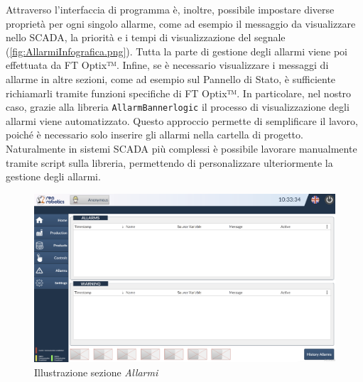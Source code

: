 Attraverso l'interfaccia di programma è, inoltre, possibile impostare diverse proprietà per ogni singolo allarme, come ad esempio il messaggio da visualizzare nello SCADA, la priorità e i tempi di visualizzazione del segnale (\ref{fig:AllarmiInfografica.png}). Tutta la parte di gestione degli allarmi viene poi effettuata da FT Optix™. Infine, se è necessario visualizzare i messaggi di allarme in altre sezioni, come ad esempio sul Pannello di Stato, è sufficiente richiamarli tramite funzioni specifiche di FT Optix™. In particolare, nel nostro caso, grazie alla libreria \verb|AllarmBannerlogic| il processo di visualizzazione degli allarmi viene automatizzato. Questo approccio permette di semplificare il lavoro, poiché è necessario solo inserire gli allarmi nella cartella di progetto. Naturalmente in sistemi SCADA più complessi è possibile lavorare manualmente tramite script sulla libreria, permettendo di personalizzare ulteriormente la gestione degli allarmi.

\begin{figure} [ht]
    \includegraphics[width=\linewidth]{Immagini/Allarmi.png}
    \caption{Illustrazione sezione \textit{Allarmi}}
    \label{fig:Allarmi.png}
\end{figure}

